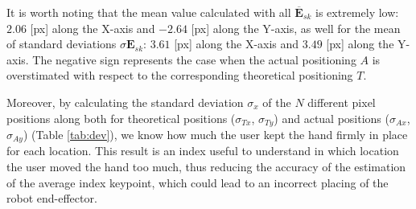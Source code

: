 \documentclass[a4paper, 10 pt, conference]{ieeeconf}      %
\begin{document}
It is worth noting that the mean value calculated with all $\overline{\mathbf{E}}_{sk}$ is extremely low: $2.06$ [px] along the X-axis and $-2.64$ [px] along the Y-axis, as well for the mean of standard deviations $\sigma{\mathbf{E}}_{sk}$: $3.61$ [px] along the X-axis and $3.49$ [px] along the Y-axis. The negative sign represents the case when the actual positioning $A$ is overstimated with respect to the corresponding theoretical positioning $T$.

Moreover, by calculating the standard deviation $\sigma_x$ of the $N$ different pixel positions along both for theoretical positions ($\sigma_{Tx}$, $\sigma_{Ty}$) and actual positions ($\sigma_{Ax}$, $\sigma_{Ay}$) (Table \ref{tab:dev}), we know how much the user kept the hand firmly in place for each location. This result is an index useful to understand in which location the user moved the hand too much, thus reducing the accuracy of the estimation of the average index keypoint, which could lead to an incorrect placing of the robot end-effector.

%
\end{document}
